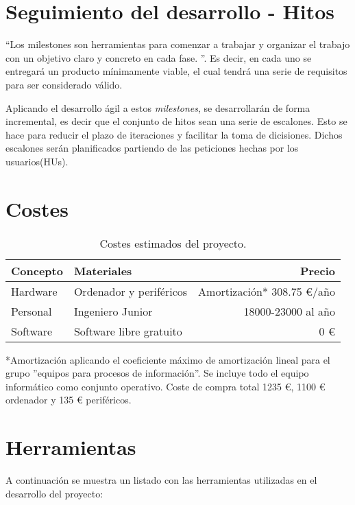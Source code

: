 \section{Seguimiento del desarrollo - Hitos}
``Los milestones son herramientas para comenzar a trabajar y organizar el trabajo con un objetivo claro y concreto en cada fase.
''\cite{iv}. Es decir, en cada uno se entregará un producto mínimamente viable, el cual tendrá una serie de requisitos para ser considerado válido.

Aplicando el desarrollo ágil a estos \textit{milestones}, se desarrollarán de forma incremental, es decir que el conjunto de hitos sean una serie de escalones. Esto se hace para reducir el plazo de iteraciones y facilitar la toma de dicisiones. Dichos escalones serán planificados partiendo de las peticiones hechas por los usuarios(HUs).


\section{Costes}
\begin{table}[H]
	\centering
	\begin{tabular}{| l | l | r |}
        \hline
        \textbf{Concepto} & \textbf{Materiales} & \textbf{Precio} \\
        \hline
        Hardware	& Ordenador y periféricos & Amortización* 308.75 €/año\\
        Personal 	& Ingeniero Junior	& 18000-23000 al año \\
        Software 	& Software libre gratuito & 0 € \\
        \hline
        \hline
	\end{tabular}
	\caption{Costes estimados del proyecto.}
\end{table}

*Amortización aplicando el coeficiente máximo de amortización lineal para el grupo ''equipos para procesos de información''\cite{amortizacion}. Se incluye todo el equipo informático como conjunto operativo. Coste de compra total 1235 €, 1100 € ordenador y 135 € periféricos.


\section{Herramientas}
A continuación se muestra un listado con las herramientas utilizadas en el desarrollo del proyecto: